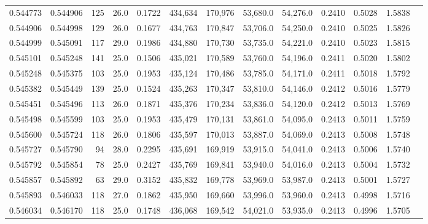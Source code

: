 \begin{tabular}{rrrrrrrrrrrrr}
0.544773 & 0.544906 &   125 & 26.0 &                                     0.1722 & 434,634 & 170,976 &  53,680.0 &  54,276.0 & 0.2410 & 0.5028 & 1.5838 \\
0.544906 & 0.544998 &   129 & 26.0 &                                     0.1677 & 434,763 & 170,847 &  53,706.0 &  54,250.0 & 0.2410 & 0.5025 & 1.5826 \\
0.544999 & 0.545091 &   117 & 29.0 &                                     0.1986 & 434,880 & 170,730 &  53,735.0 &  54,221.0 & 0.2410 & 0.5023 & 1.5815 \\
0.545101 & 0.545248 &   141 & 25.0 &                                     0.1506 & 435,021 & 170,589 &  53,760.0 &  54,196.0 & 0.2411 & 0.5020 & 1.5802 \\
0.545248 & 0.545375 &   103 & 25.0 &                                     0.1953 & 435,124 & 170,486 &  53,785.0 &  54,171.0 & 0.2411 & 0.5018 & 1.5792 \\
0.545382 & 0.545449 &   139 & 25.0 &                                     0.1524 & 435,263 & 170,347 &  53,810.0 &  54,146.0 & 0.2412 & 0.5016 & 1.5779 \\
0.545451 & 0.545496 &   113 & 26.0 &                                     0.1871 & 435,376 & 170,234 &  53,836.0 &  54,120.0 & 0.2412 & 0.5013 & 1.5769 \\
0.545498 & 0.545599 &   103 & 25.0 &                                     0.1953 & 435,479 & 170,131 &  53,861.0 &  54,095.0 & 0.2413 & 0.5011 & 1.5759 \\
0.545600 & 0.545724 &   118 & 26.0 &                                     0.1806 & 435,597 & 170,013 &  53,887.0 &  54,069.0 & 0.2413 & 0.5008 & 1.5748 \\
0.545727 & 0.545790 &    94 & 28.0 &                                     0.2295 & 435,691 & 169,919 &  53,915.0 &  54,041.0 & 0.2413 & 0.5006 & 1.5740 \\
0.545792 & 0.545854 &    78 & 25.0 &                                     0.2427 & 435,769 & 169,841 &  53,940.0 &  54,016.0 & 0.2413 & 0.5004 & 1.5732 \\
0.545857 & 0.545892 &    63 & 29.0 &                                     0.3152 & 435,832 & 169,778 &  53,969.0 &  53,987.0 & 0.2413 & 0.5001 & 1.5727 \\
0.545893 & 0.546033 &   118 & 27.0 &                                     0.1862 & 435,950 & 169,660 &  53,996.0 &  53,960.0 & 0.2413 & 0.4998 & 1.5716 \\
0.546034 & 0.546170 &   118 & 25.0 &                                     0.1748 & 436,068 & 169,542 &  54,021.0 &  53,935.0 & 0.2413 & 0.4996 & 1.5705 \\

\end{tabular}
